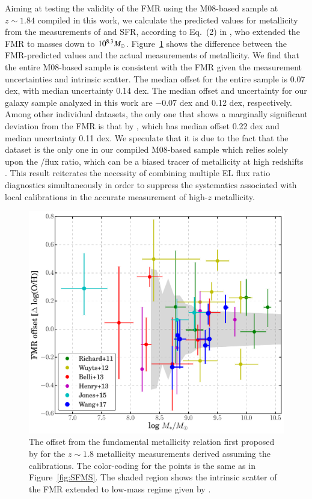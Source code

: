 Aiming at testing the validity of the FMR using the M08-based sample at $z\sim1.84$ compiled
in this work, we calculate the predicted values for metallicity from the measurements of
\Mstar and SFR, according to Eq.~(2) in \citet{Mannucci:2011be}, who extended the FMR to
masses down to $10^{8.3}M_\odot$.
Figure~\ref{fig:FMR} shows the difference between the FMR-predicted
values and the actual measurements of metallicity.  We find that the entire
M08-based sample is consistent with the FMR given the measurement
uncertainties and intrinsic scatter. The median offset for the entire
sample is 0.07 dex, with median uncertainty 0.14 dex.
The median offset and uncertainty for our galaxy sample analyzed in this work are $-0.07$ dex and 0.12 dex, respectively. Among
other individual datasets, the only one that shows a
marginally significant deviation from the FMR is that by
\citet{Wuyts:2012gb}, which has median offset 0.22 dex and median
uncertainty 0.11 dex. We speculate that it is due to the fact that the
\citet{Wuyts:2012gb} dataset is the only one in our compiled M08-based
sample which relies solely upon the \NII/\Ha flux ratio, which can be
a biased tracer of metallicity at high redshifts \citep{2015ApJ...801...88S,Sanders:2015gk}.
This result reiterates the necessity of combining multiple EL flux ratio diagnostics
simultaneously in order to suppress the systematics associated with local calibrations in the
accurate measurement of high-$z$ metallicity.

\begin{figure}
    \centering
    \includegraphics[width=\textwidth]{fig/FMRoffset.pdf}
    \caption[Offset from the fundamental metallicity relation.]{The offset from the fundamental metallicity relation first proposed by
    \citet{2010MNRAS.408.2115M} for the $z\sim1.8$ metallicity measurements derived assuming
    the \citet{2008A&A...488..463M} calibrations.  The color-coding for the points is the
    same as in Figure~\ref{fig:SFMS}.  The shaded region shows the intrinsic scatter of the
    FMR extended to low-mass regime given by
    \citet{Mannucci:2011be}.}
    \label{fig:FMR}
\end{figure}

